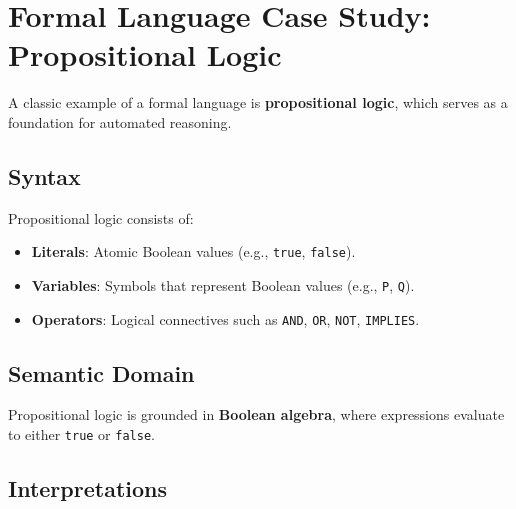 \documentclass{book}
\providecommand{\tightlist}{%
  \setlength{\itemsep}{0pt}\setlength{\parskip}{0pt}}
\begin{document}
\hypertarget{pandoc.profile.debug__pandoc__debug__src__languages.md__formal-language-case-study-propositional-logic}{%
\section*{Formal Language Case Study: Propositional Logic}\label{pandoc.profile.debug__pandoc__debug__src__languages.md__formal-language-case-study-propositional-logic}}

A classic example of a formal language is \textbf{propositional logic}, which serves as a foundation for automated reasoning.

\hypertarget{pandoc.profile.debug__pandoc__debug__src__languages.md__syntax}{%
\subsection*{Syntax}\label{pandoc.profile.debug__pandoc__debug__src__languages.md__syntax}}

Propositional logic consists of:

\begin{itemize}
\tightlist
\item
  \textbf{Literals}: Atomic Boolean values (e.g., \texttt{true}, \texttt{false}).
\item
  \textbf{Variables}: Symbols that represent Boolean values (e.g., \texttt{P}, \texttt{Q}).
\item
  \textbf{Operators}: Logical connectives such as \texttt{AND}, \texttt{OR}, \texttt{NOT}, \texttt{IMPLIES}.
\end{itemize}

\hypertarget{pandoc.profile.debug__pandoc__debug__src__languages.md__semantic-domain}{%
\subsection*{Semantic Domain}\label{pandoc.profile.debug__pandoc__debug__src__languages.md__semantic-domain}}

Propositional logic is grounded in \textbf{Boolean algebra}, where expressions evaluate to either \texttt{true} or \texttt{false}.

\hypertarget{pandoc.profile.debug__pandoc__debug__src__languages.md__interpretations}{%
\subsection*{Interpretations}\label{pandoc.profile.debug__pandoc__debug__src__languages.md__interpretations}}
\end{document}
